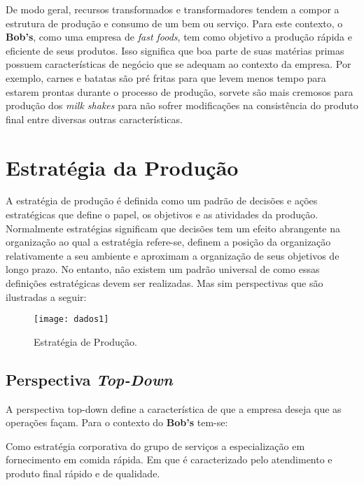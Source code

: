 		De modo geral, recursos transformados e transformadores tendem a compor a estrutura de produção e consumo de um bem ou serviço. Para este contexto, o \textbf{Bob’s}, como uma empresa de \emph{fast foods}, tem como objetivo a produção rápida e eficiente de seus produtos. Isso significa que boa parte de suas matérias primas possuem características de negócio que se adequam ao contexto da empresa. Por exemplo, carnes e batatas são pré fritas para que levem menos tempo para estarem prontas durante o processo de produção, sorvete são mais cremosos para produção dos \emph{milk shakes} para não sofrer modificações na consistência do produto final entre diversas outras características.

	\section[Estratégia da Produção]{Estratégia da Produção}
	\label{sec:dados_estrategia}

		A estratégia de produção é definida como um padrão de decisões e ações estratégicas que define o papel, os objetivos e as atividades da produção. Normalmente estratégias significam que decisões tem um efeito abrangente na organização ao qual a estratégia refere-se, definem a posição da organização relativamente a seu ambiente e aproximam a organização de seus objetivos de longo prazo. No entanto, não existem um padrão universal de como essas definições estratégicas devem ser realizadas. Mas sim perspectivas que são ilustradas a seguir:

		\begin{figure}[h]
			\centering
			\texttt{[image: dados1]}
			\caption[Estratégia de Produção]{Estratégia de Produção. \cite{slack}}
			\label{fig:dados1}
		\end{figure}

		\subsection[Perspectiva Top-Down]{Perspectiva \emph{Top-Down}}
		\label{sec:dados_perspNorte}

			A perspectiva top-down define a característica de que a empresa deseja que as operações façam. Para o contexto do \textbf{Bob’s} tem-se:

			Como estratégia corporativa do grupo de serviços a especialização em fornecimento em comida rápida. Em que é caracterizado pelo atendimento e produto final rápido e de qualidade.

